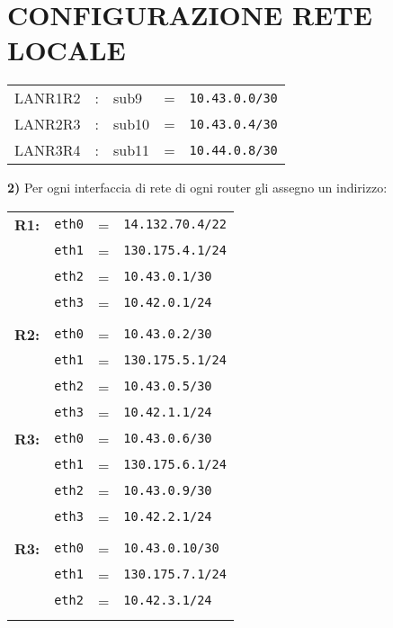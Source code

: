 \documentclass{article}
\def\code#1{\texttt{#1}}
\newenvironment{homeworkProblem}[1][-1]{
    \section{CONFIGURAZIONE RETE LOCALE}
}{}
\begin{document}
\begin{homeworkProblem}
\begin{center}
\begin{tabular}{r c l c c}
 		LANR1R2 & : & sub9 & = & \code{10.43.0.0/30}\\
 		LANR2R3 & : & sub10 & = & \code{10.43.0.4/30}\\
 		LANR3R4 & : & sub11 & = & \code{10.44.0.8/30}\\
 	\end{tabular}
 	\end{center}
 	
 	\pagebreak
 	\textbf{2)} Per ogni interfaccia di rete di ogni router gli assegno un indirizzo:
 	\begin{center}
 	\begin{tabular}{r r c l }
 		\textbf{R1:} & \code{eth0} & = & \code{14.132.70.4/22}\\
 			         & \code{eth1} & = & \code{130.175.4.1/24}\\
 			         & \code{eth2} & = & \code{10.43.0.1/30}\\
 			         & \code{eth3} & = & \code{10.42.0.1/24}\\\\
 			         
 	    \textbf{R2:} & \code{eth0} & = & \code{10.43.0.2/30}\\
 			         & \code{eth1} & = & \code{130.175.5.1/24}\\
 			         & \code{eth2} & = & \code{10.43.0.5/30}\\
 			         & \code{eth3} & = & \code{10.42.1.1/24}\\
 			         
 	    \textbf{R3:} & \code{eth0} & = & \code{10.43.0.6/30}\\
 			         & \code{eth1} & = & \code{130.175.6.1/24}\\
 			         & \code{eth2} & = & \code{10.43.0.9/30}\\
 			         & \code{eth3} & = & \code{10.42.2.1/24}\\\\
 			         
 	    \textbf{R3:} & \code{eth0} & = & \code{10.43.0.10/30}\\
 			         & \code{eth1} & = & \code{130.175.7.1/24}\\
 			         & \code{eth2} & = & \code{10.42.3.1/24}\\\\ 	
 	\end{tabular}
 	\end{center}
 	
 	
 	

\end{homeworkProblem}
\end{document}
